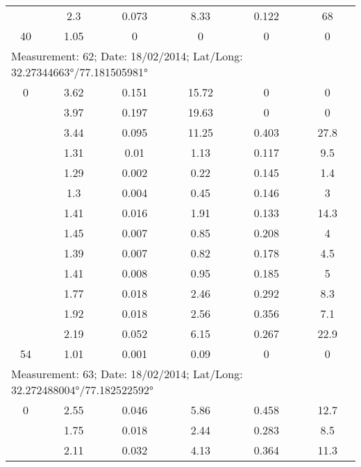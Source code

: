 \begin{longtable}{cccccc}
		& 2.3   & 0.073 & 8.33  & 0.122 & 68 \\
		
		40    & 1.05  & 0     & 0     & 0     & 0 \\		
		\midrule
		
		\multicolumn{6}{l}{Measurement: 62; Date: 18/02/2014; 
			Lat/Long: 32.27344663°/77.181505981°} \\		
		\midrule 	
		0     & 3.62  & 0.151 & 15.72 & 0     & 0 \\
		
		& 3.97  & 0.197 & 19.63 & 0     & 0 \\
		
		& 3.44  & 0.095 & 11.25 & 0.403 & 27.8 \\
		
		& 1.31  & 0.01  & 1.13  & 0.117 & 9.5 \\
		
		& 1.29  & 0.002 & 0.22  & 0.145 & 1.4 \\
		
		& 1.3   & 0.004 & 0.45  & 0.146 & 3 \\
		
		& 1.41  & 0.016 & 1.91  & 0.133 & 14.3 \\
		
		& 1.45  & 0.007 & 0.85  & 0.208 & 4 \\
		
		& 1.39  & 0.007 & 0.82  & 0.178 & 4.5 \\
		
		& 1.41  & 0.008 & 0.95  & 0.185 & 5 \\
		
		& 1.77  & 0.018 & 2.46  & 0.292 & 8.3 \\
		
		& 1.92  & 0.018 & 2.56  & 0.356 & 7.1 \\
		
		& 2.19  & 0.052 & 6.15  & 0.267 & 22.9 \\
		
		54    & 1.01  & 0.001 & 0.09  & 0     & 0 \\
		\midrule
		\multicolumn{6}{l}{Measurement: 63; Date: 18/02/2014;
			Lat/Long: 32.272488004°/77.182522592°} \\	
		\midrule 		
		0     & 2.55  & 0.046 & 5.86  & 0.458 & 12.7 \\
		
		& 1.75  & 0.018 & 2.44  & 0.283 & 8.5 \\
		
		& 2.11  & 0.032 & 4.13  & 0.364 & 11.3 \\
		

\end{longtable}
